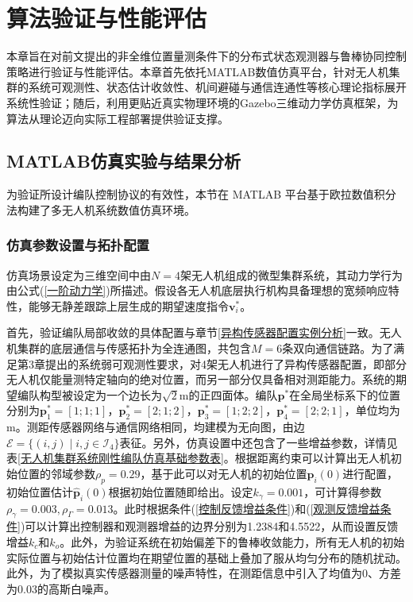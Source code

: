 \chapter{算法验证与性能评估} 

本章旨在对前文提出的非全维位置量测条件下的分布式状态观测器与鲁棒协同控制策略进行验证与性能评估。本章首先依托MATLAB数值仿真平台，针对无人机集群的系统可观测性、状态估计收敛性、机间避碰与通信连通性等核心理论指标展开系统性验证；随后，利用更贴近真实物理环境的Gazebo三维动力学仿真框架，为算法从理论迈向实际工程部署提供验证支撑。

\section{MATLAB仿真实验与结果分析}
\label{MATLAB仿真实验与结果分析章节}
为验证所设计编队控制协议的有效性，本节在 MATLAB 平台基于欧拉数值积分法构建了多无人机系统数值仿真环境。

\subsection{仿真参数设置与拓扑配置}
仿真场景设定为三维空间中由$N=4$架无人机组成的微型集群系统，其动力学行为由公式(\ref{一阶动力学})所描述。假设各无人机底层执行机构具备理想的宽频响应特性，能够无静差跟踪上层生成的期望速度指令$\mathbf{v}_i^*$。

首先，验证编队局部收敛的具体配置与章节\ref{异构传感器配置实例分析}一致。无人机集群的底层通信与传感拓扑为全连通图，共包含$M=6$条双向通信链路。为了满足第3章提出的系统弱可观测性要求，对4架无人机进行了异构传感器配置，即部分无人机仅能量测特定轴向的绝对位置，而另一部分仅具备相对测距能力。系统的期望编队构型被设定为一个边长为$\sqrt{2}$m的正四面体。编队$\mathbf{p}^*$在全局坐标系下的位置分别为$\mathbf{p}_1^*=[1;1;1]$，$\mathbf{p}_2^*=[2;1;2]$，$\mathbf{p}_3^*=[1;2;2]$，$\mathbf{p}_4^*=[2;2;1]$，单位均为m。测距传感器网络与通信网络相同，均建模为无向图，由边$\mathcal{E}=\{(i,j) \mid i,j\in \mathcal{I}_{4}\}$表征。另外，仿真设置中还包含了一些增益参数，详情见表\ref{无人机集群系统刚性编队仿真基础参数表}。根据距离约束可以计算出无人机初始位置的邻域参数$\rho_p=0.29$，基于此可以对无人机的初始位置$\mathbf{p}_i(0)$进行配置，初始位置估计$\hat{\mathbf{p}}_i(0)$根据初始位置随即给出。设定$k_\gamma=0.001$，可计算得参数$\rho_\gamma=0.003,\rho_\Gamma=0.013$。此时根据条件(\ref{控制反馈增益条件})和(\ref{观测反馈增益条件})可以计算出控制器和观测器增益的边界分别为1.2384和4.5522，从而设置反馈增益$k_c$和$k_o$。此外，为验证系统在初始偏差下的鲁棒收敛能力，所有无人机的初始实际位置与初始估计位置均在期望位置的基础上叠加了服从均匀分布的随机扰动。此外，为了模拟真实传感器测量的噪声特性，在测距信息中引入了均值为0、方差为0.03的高斯白噪声。

